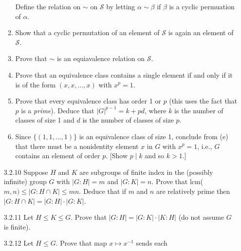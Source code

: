 \begin{enumerate}
\begin{enumerate}
                           Define the relation on $\sim$ on $\mathcal{S}$ by
                           letting $\alpha \sim \beta$ if $\beta$ is a cyclic
                           permuation of $\alpha$.
                     \item Show that a cyclic permutation of an element of
                           $\mathcal{S}$ is again an element of $\mathcal{S}$.
                     \item Prove that $\sim$ is an equiavalence relation on
                           $\mathcal{S}$.
                     \item Prove that an equivalence class contains a single
                           element if and only if it is of the form
                           $(x, x, \ldots, x)$ with $x^p = 1$.
                     \item Prove that every equivalence class has order 1 or $p$
                           (this uses the fact that $p$ is a \textit{prime}).
                           Deduce that $|G|^{p-1} = k + pd$, where $k$ is the
                           number of classes of size 1 and $d$ is the number of
                           classes of size $p$.
                     \item Since $\{(1, 1, \ldots, 1)\}$ is an equivalence class
                           of size 1, conclude from (e) that there must be a
                           nonidentity element $x$ in $G$ with $x^p = 1$, i.e.,
                           $G$ contains an element of order $p$. [Show
                           $p \mid k$ and so $k > 1$.]
                  \end{enumerate}                  
   \item[3.2.10]  Suppose $H$ and $K$ are subgroups of finite index in the
                  (possibly infinite) group $G$ with $|G : H| = m$ and
                  $|G : K| = n$. Prove that lcm($m, n) \le
                  |G : H \cap K| \le mn$. Deduce that if $m$ and $n$ are
                  relatively prime then $|G : H \cap K| =|G : H| \cdot |G : K|$.
   \item[3.2.11]  Let $H \le K \le G$. Prove that
                  $|G : H| = |G : K| \cdot |K : H|$ (do not assume $G$ is
                  finite).
   \item[3.2.12]  Let $H \le G$. Prove that map $x \mapsto x^{-1}$ sends each

\end{enumerate}
